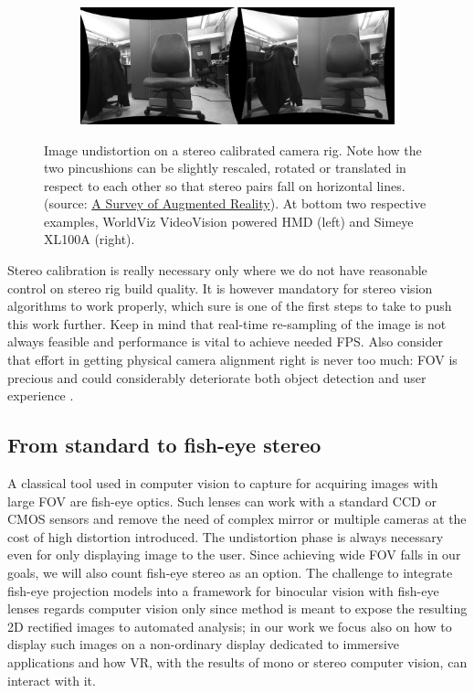 \begin{figure}
\begin{subfigure}{0.99\linewidth}
\end{subfigure}
\\
\begin{subfigure}{0.99\linewidth}
\includegraphics[width=\linewidth]{pictures/stereo-undistorted}
\end{subfigure}
\caption{Image undistortion on a stereo calibrated camera rig. Note how the two pincushions can be slightly rescaled, rotated or translated in respect to each other so that stereo pairs fall on horizontal lines. (source: \href{http://www.cs.unc.edu/~azuma/ARpresence.pdf}{A Survey of Augmented Reality}). At bottom two respective examples, WorldViz VideoVision powered HMD (left) and Simeye XL100A (right).}
\label{fig:stereo_undistort}
\end{figure}

Stereo calibration is really necessary only where we do not have reasonable control on stereo rig build quality. It is however mandatory for stereo vision algorithms to work properly, which sure is one of the first steps to take to push this work further. Keep in mind that real-time re-sampling of the image is not always feasible and performance is vital to achieve needed FPS. Also consider that effort in getting physical camera alignment right is never too much: FOV is precious and could considerably deteriorate both object detection and user experience \cite{restricting_FOV}.

\subsection{From standard to fish-eye stereo}
A classical tool used in computer vision to capture for acquiring images with large FOV are fish-eye optics. Such lenses can work with a standard CCD or CMOS sensors and remove the need of complex mirror or multiple cameras at the cost of high distortion introduced. The undistortion phase is always necessary even for only displaying image to the user. Since achieving wide FOV falls in our goals, we will also count fish-eye stereo as an option. The challenge to integrate fish-eye projection models into a framework for binocular vision with fish-eye lenses regards computer vision only since method is meant to expose the resulting 2D rectified images to automated analysis; in our work we focus also on how to display such images on a non-ordinary display dedicated to immersive applications and how VR, with the results of mono or stereo computer vision, can interact with it.

